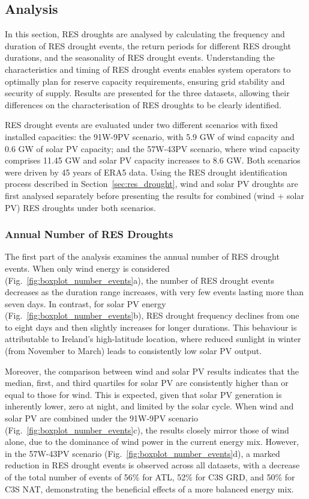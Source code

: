 \documentclass[preprint, 12pt]{elsarticle}
\begin{document}
\subsection{Analysis}
\label{sec:analysis}

In this section, RES droughts are analysed by calculating the frequency and duration of RES drought events, the return periods for different RES drought durations, and the seasonality of RES drought events. Understanding the characteristics and timing of RES drought events enables system operators to optimally plan for reserve capacity requirements, ensuring grid stability and security of supply. Results are presented for the three datasets, allowing their differences on the characterisation of RES droughts to be clearly identified.

RES drought events are evaluated under two different scenarios with fixed installed capacities: the 91W-9PV scenario, with 5.9 GW of wind capacity and 0.6 GW of solar PV capacity; and the 57W-43PV scenario, where wind capacity comprises 11.45 GW and solar PV capacity increases to 8.6 GW. Both scenarios were driven by 45 years of ERA5 data. Using the RES drought identification process described in Section~\ref{sec:res_drought}, wind and solar PV droughts are first analysed separately before presenting the results for combined (wind + solar PV) RES droughts under both scenarios.

\subsubsection{Annual Number of RES Droughts}

The first part of the analysis examines the annual number of RES drought events. When only wind energy is considered (Fig.~\ref{fig:boxplot_number_events}a), the number of RES drought events decreases as the duration range increases, with very few events lasting more than seven days. In contrast, for solar PV energy (Fig.~\ref{fig:boxplot_number_events}b), RES drought frequency declines from one to eight days and then slightly increases for longer durations. This behaviour is attributable to Ireland's high-latitude location, where reduced sunlight in winter (from November to March) leads to consistently low solar PV output.

Moreover, the comparison between wind and solar PV results indicates that the median, first, and third quartiles for solar PV are consistently higher than or equal to those for wind. This is expected, given that solar PV generation is inherently lower, zero at night, and limited by the solar cycle. When wind and solar PV are combined under the 91W-9PV scenario (Fig.~\ref{fig:boxplot_number_events}c), the results closely mirror those of wind alone, due to the dominance of wind power in the current energy mix. However, in the 57W-43PV scenario (Fig.~\ref{fig:boxplot_number_events}d), a marked reduction in RES drought events is observed across all datasets, with a decrease of the total number of events of 56\% for ATL, 52\% for C3S GRD, and 50\% for C3S NAT, demonstrating the beneficial effects of a more balanced energy mix.
\end{document}
